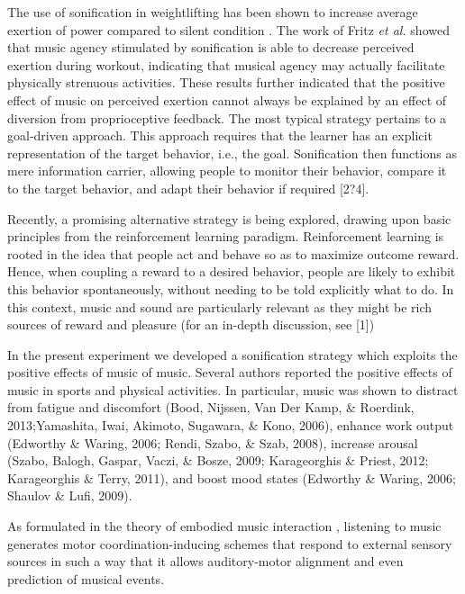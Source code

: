 \documentclass[10pt,letterpaper]{article}
\begin{document}
The use of sonification in weightlifting has been shown to increase average exertion of power compared to silent condition \cite{murgia2012using}. The work of Fritz \emph{et al.}  \cite{fritz2013musical} showed that music agency stimulated by sonification is able to decrease perceived exertion during workout, indicating that musical agency may actually facilitate physically strenuous activities. These results further indicated that the positive effect of music on perceived exertion cannot always be explained by an effect of diversion from proprioceptive feedback. The most typical strategy pertains to a goal-driven approach. This approach requires that the learner has an explicit representation of the target behavior, i.e., the goal. Sonification then functions as mere information carrier, allowing people to monitor their behavior, compare it to the target behavior, and adapt their behavior if required [2?4]. 



Recently, a promising alternative strategy is being explored, drawing upon basic principles from the reinforcement learning paradigm. Reinforcement learning is rooted in the idea that people act and behave so as to maximize outcome reward. Hence, when coupling a reward to a desired behavior, people are likely to exhibit this behavior spontaneously, without needing to be told explicitly what to do. In this context, music and sound are particularly relevant as they might be rich sources of reward and pleasure (for an in-depth discussion, see [1])


In the present experiment we developed a sonification strategy which exploits the positive effects of music of music. 
Several authors reported the positive effects of music in sports and physical activities. In particular, music was shown to distract from fatigue and discomfort (Bood, Nijssen, Van Der Kamp, \& Roerdink, 2013;Yamashita, Iwai, Akimoto, Sugawara, \& Kono, 2006), enhance work output (Edworthy \& Waring, 2006; Rendi, Szabo, \& Szab, 2008), increase arousal (Szabo, Balogh, Gaspar, Vaczi, \& Bosze, 2009; Karageorghis \& Priest, 2012; Karageorghis \& Terry, 2011), and boost mood states (Edworthy \& Waring, 2006; Shaulov \& Lufi, 2009).

As formulated in the theory of embodied music interaction \cite{Marc_EmbodiedMusic,godoy2010musical}, listening to music generates motor coordination-inducing schemes that respond to external sensory sources in such a way that it allows auditory-motor alignment and even prediction of musical events. 
\end{document}
